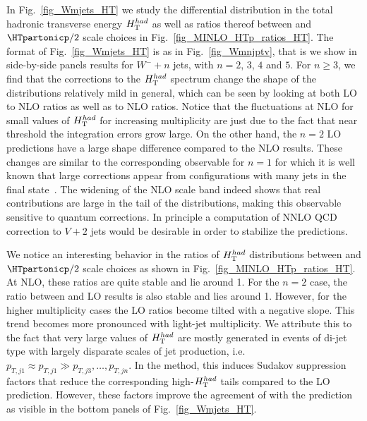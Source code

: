 In Fig.~\ref{fig_Wmjets_HT} we study the differential distribution in
the total hadronic transverse energy $H_{\textrm T}^{had}$ as well as ratios thereof
between \MILNLOp{} and $\HTpartonicp/2$ scale choices in
Fig.~\ref{fig_MINLO_HTp_ratios_HT}. The format of Fig.~\ref{fig_Wmjets_HT} is as
in Fig.~\ref{fig_Wmnjptv}, that is we show in side-by-side panels results for $W^-+n$
jets, with $n=2$, $3$, $4$ and $5$. For $n\ge 3$, we find that the corrections to the $H_{\textrm T}^{had}$ spectrum change the shape of the
distributions relatively mild in general, which can be seen by looking at both LO to NLO ratios as well
as \MINLOp{} to NLO ratios. Notice that the fluctuations at NLO for small
values of $H_{\textrm T}^{had}$ for increasing multiplicity are just due to the fact
that near threshold the integration errors grow large. On the other hand, the
$n=2$ LO predictions have a large shape difference compared to the NLO
results. These changes are similar to the corresponding observable for $n=1$ for which it is well
known that large corrections appear from configurations with many jets in the
final state~\cite{Rubin:2010xp}. The widening of the NLO scale band indeed shows that real
contributions are large in the tail of the distributions, making this observable
sensitive to quantum corrections. In principle a computation of NNLO QCD correction to $V+2$
jets would be desirable in order to stabilize the predictions.

We notice an interesting behavior in the ratios of $H_{\textrm T}^{had}$ distributions between \MILNLOp{} and $\HTpartonicp/2$ scale choices as shown in Fig.~\ref{fig_MINLO_HTp_ratios_HT}. At NLO, these ratios are quite stable and lie around 1. For the $n=2$ case, the ratio between \MILOp{} and LO results is also stable and lies around 1. However, for the higher multiplicity cases the LO ratios become tilted with a negative slope. This trend becomes more pronounced with light-jet multiplicity. We attribute this to the fact that very
large values of $H_{\textrm T}^{had}$ are mostly generated in events of di-jet type with largely
disparate scales of jet production, i.e.\ $p_{T,j1}\approx p_{T,j1}\gg p_{T,j3},\ldots,p_{T,jn}$. In the \MILOp{} method, this induces Sudakov suppression factors that reduce the corresponding high-$H_{\textrm T}^{had}$
tails compared to the LO prediction. However, these factors improve the agreement of \MILOp{} with the \MINLOp{} prediction as visible in the bottom panels of Fig.~\ref{fig_Wmjets_HT}.


